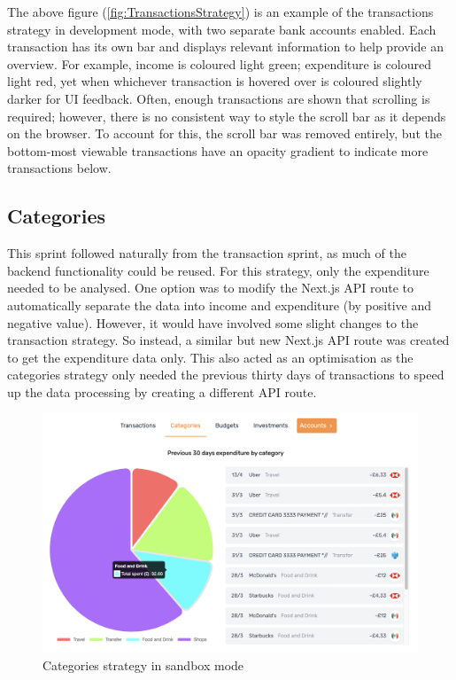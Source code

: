 The above figure (\ref{fig:TransactionsStrategy}) is an example of the transactions strategy in development mode, with two separate bank accounts enabled. Each transaction has its own bar and displays relevant information to help provide an overview. For example, income is coloured light green; expenditure is coloured light red, yet when whichever transaction is hovered over is coloured slightly darker for UI feedback. Often, enough transactions are shown that scrolling is required; however, there is no consistent way to style the scroll bar as it depends on the browser. To account for this, the scroll bar was removed entirely, but the bottom-most viewable transactions have an opacity gradient to indicate more transactions below.

\subsection{Categories}
This sprint followed naturally from the transaction sprint, as much of the backend functionality could be reused. For this strategy, only the expenditure needed to be analysed. One option was to modify the Next.js API route to automatically separate the data into income and expenditure (by positive and negative value). However, it would have involved some slight changes to the transaction strategy. So instead, a similar but new Next.js API route was created to get the expenditure data only. This also acted as an optimisation as the categories strategy only needed the previous thirty days of transactions to speed up the data processing by creating a different API route.

\begin{figure}[H]
	\centering
	\includegraphics[width=\textwidth]{images/categories_sandbox.png}
	\caption{Categories strategy in sandbox mode}
	\label{fig:CategoriesStrategySandbox}
\end{figure}

